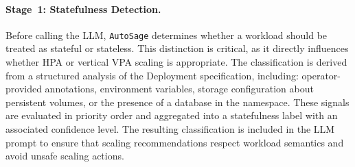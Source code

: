 \documentclass[sigconf]{acmart}
\newcommand{\Solution}{\texttt{AutoSage}}
\begin{document}

\paragraph{Stage~1: Statefulness Detection.}

Before calling the LLM, \Solution{} determines whether a workload should be treated as stateful or stateless. This distinction is critical, as it directly influences whether HPA or vertical VPA scaling is appropriate.
The classification is derived from a structured analysis of the Deployment specification, including: operator-provided annotations, environment variables, storage configuration about persistent volumes, or the presence of a database in the namespace. These signals are evaluated in priority order and aggregated into a statefulness label with an associated confidence level.
The resulting classification is included in the LLM prompt to ensure that scaling recommendations respect workload semantics and avoid unsafe scaling actions.
\end{document}
